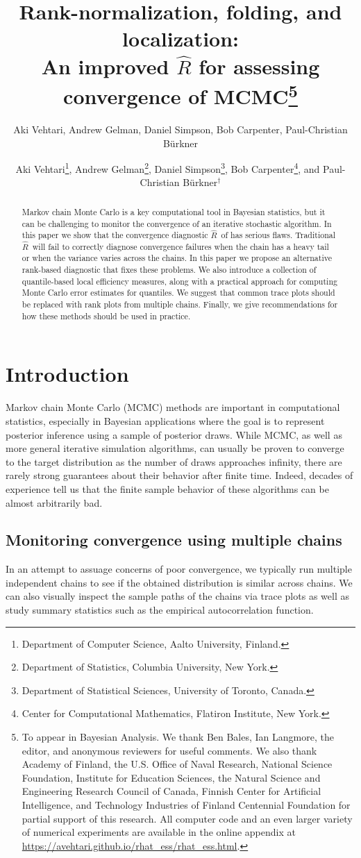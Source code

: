 \documentclass[american,]{article}
\title{Rank-normalization, folding, and localization:\\
  An improved $\widehat{R}$ for assessing convergence of MCMC\footnote{To appear in Bayesian Analysis. We thank Ben Bales, Ian Langmore, the editor, and anonymous reviewers for useful comments. We also thank Academy of Finland, the U.S. Office of Naval Research, National Science Foundation, Institute for Education Sciences, the Natural Science and Engineering Research Council of Canada, Finnish Center for Artificial Intelligence, and Technology Industries of Finland Centennial Foundation for partial support of this research.  All computer code and an 
even larger variety of numerical experiments are available in the online 
appendix at \url{https://avehtari.github.io/rhat_ess/rhat_ess.html}.}\vspace{.1in}}
\author{Aki Vehtari, Andrew Gelman, Daniel Simpson, Bob Carpenter, Paul-Christian Bürkner}
\author{
Aki Vehtari\footnote{Department of Computer Science, Aalto University, Finland.},
   Andrew Gelman\footnote{Department of Statistics, Columbia University, New York.},
 Daniel Simpson\footnote{Department of Statistical Sciences, University of Toronto, Canada.},
 Bob Carpenter\footnote{Center for Computational Mathematics, Flatiron Institute, New York.},
and Paul-Christian B\"{u}rkner$^\dagger$
}
\date{}
\newcommand{\Rhat}{$\widehat{R}$}
\theoremstyle{definition}
\begin{document}
\maketitle
\begin{abstract}
  Markov chain Monte Carlo is a key computational tool in Bayesian 
  statistics, but it can be challenging to monitor the convergence of an iterative stochastic algorithm.
In this paper we show that the convergence diagnostic \Rhat\ 
of \citet{Gelman+Rubin:1992} has serious flaws. Traditional \Rhat\ will fail to correctly diagnose
convergence failures when the chain has a heavy tail or when the variance varies across 
the chains. In this paper we propose an alternative rank-based diagnostic that fixes these 
problems. We also introduce
  a collection of quantile-based local efficiency
  measures, along with a practical approach for computing Monte Carlo error
  estimates for quantiles. We suggest that common trace plots should
  be replaced with rank plots from multiple chains. Finally, we give
  recommendations for how these methods should be used
  in practice.
\end{abstract}

\hypertarget{introduction}{%
\section{Introduction}\label{introduction}}

Markov chain Monte Carlo (MCMC) methods are important in computational statistics, especially 
in Bayesian applications where the goal is to represent
posterior inference using a sample of posterior draws. While MCMC, 
as well as more general iterative
simulation algorithms, can usually be proven to converge
to the target distribution as the number of draws approaches infinity,
there are rarely strong guarantees about their behavior after finite time. Indeed, decades of experience tell us that
the finite sample behavior of these algorithms can be almost arbitrarily bad.


\subsection{Monitoring convergence using multiple chains}


In an attempt to assuage concerns of poor convergence, we typically run multiple 
independent chains  to see if the obtained 
distribution is similar across chains.  We can also visually inspect
the sample paths of the chains via trace plots as well as study summary 
statistics such as the empirical autocorrelation function. 
\end{document}
